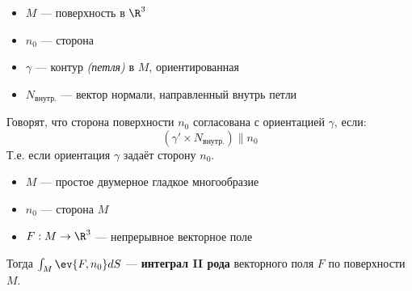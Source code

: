 \begin{definition}\itemfix
    \begin{itemize}
        \item \(M\) --- поверхность в \(\R^3\)
        \item \(n_0\) --- сторона
        \item \(\gamma\) --- контур \textit{(петля)} в \(M\), ориентированная
        \item \(N_{\text{внутр.}}\) --- вектор нормали, направленный внутрь петли
    \end{itemize}

    Говорят, что сторона поверхности \(n_0\) согласована с ориентацией \(\gamma\), если:
    \[(\gamma' \times N_{\text{внутр.}}) \parallel n_0\]
    Т.е. если ориентация \(\gamma\) задаёт сторону \(n_0\).
\end{definition}

\begin{definition}\itemfix
    \begin{itemize}
        \item \(M\) --- простое двумерное гладкое многообразие
        \item \(n_0\) --- сторона \(M\)
        \item \(F : M \to \R^3\) --- непрерывное векторное поле
    \end{itemize}
    Тогда \(\int_M \ev{F, n_0} dS\) --- \textbf{интеграл II рода} векторного поля \(F\) по поверхности \(M\).
\end{definition}

